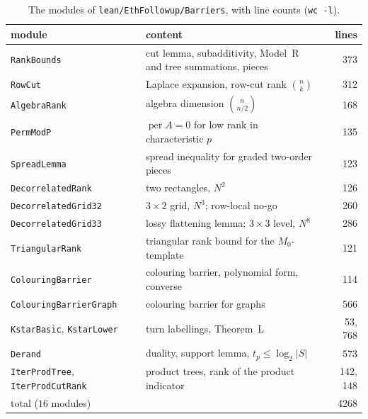 \documentclass[10pt]{amsart}
\theoremstyle{plain}
\theoremstyle{definition}
\theoremstyle{remark}
\numberwithin{equation}{section}
\newcommand{\per}{\operatorname{per}}
\begin{document}
\begin{table}[ht]
\centering\small
\begin{tabular}{@{}lp{}r@{}}
\toprule
module & content & lines\\
\midrule
\texttt{RankBounds} & cut lemma, subadditivity, Model~R and tree summations, pieces & 373\\
\texttt{RowCut} & Laplace expansion, row-cut rank $\binom nk$ & 312\\
\texttt{AlgebraRank} & algebra dimension $\binom n{n/2}$ & 168\\
\texttt{PermModP} & $\per A=0$ for low rank in characteristic $p$ & 135\\
\texttt{SpreadLemma} & spread inequality for graded two-order pieces & 123\\
\texttt{DecorrelatedRank} & two rectangles, $N^2$ & 126\\
\texttt{DecorrelatedGrid32} & $3\times2$ grid, $N^3$; row-local no-go & 260\\
\texttt{DecorrelatedGrid33} & lossy flattening lemma; $3\times3$ level, $N^8$ & 286\\
\texttt{TriangularRank} & triangular rank bound for the $M_0$-template & 121\\
\texttt{ColouringBarrier} & colouring barrier, polynomial form, converse & 114\\
\texttt{ColouringBarrierGraph} & colouring barrier for graphs & 566\\
\texttt{KstarBasic}, \texttt{KstarLower} & turn labellings, Theorem~L & 53, 768\\
\texttt{Derand} & duality, support lemma, $t_p\le\log_2|S|$ & 573\\
\texttt{IterProdTree}, \texttt{IterProdCutRank} & product trees, rank of the product indicator & 142, 148\\
\midrule
total ($16$ modules) & & 4268\\
\bottomrule
\end{tabular}
\caption{The modules of \texttt{lean/EthFollowup/Barriers}, with line counts (\texttt{wc -l}).}\label{tab:modules}
\end{table}
\end{document}
